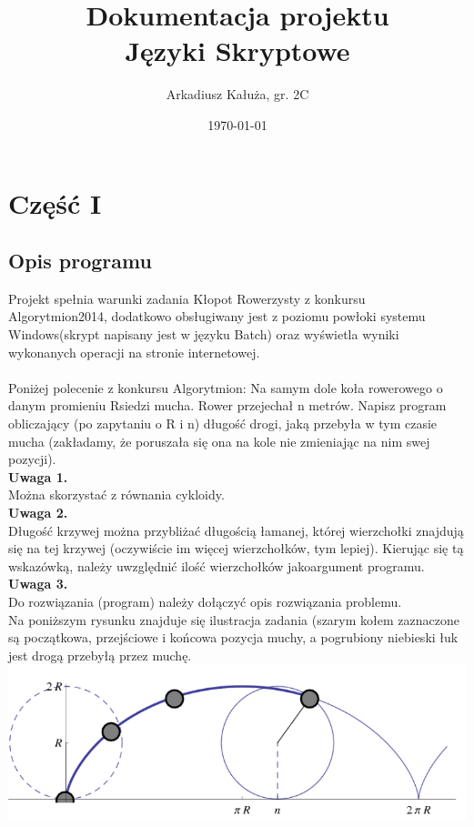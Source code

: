 \documentclass[12pt,a4paper]{article}
\begin{document}
	
	\title{Dokumentacja projektu\\ Języki Skryptowe}
	\author{Arkadiusz Kałuża, gr. 2C}
	\date{\today}
	
	\maketitle
	\newpage
	\section*{Część I}
	\subsection*{Opis programu}
	Projekt spełnia warunki zadania Kłopot Rowerzysty z konkursu Algorytmion2014, dodatkowo obsługiwany jest z poziomu powłoki systemu Windows(skrypt napisany jest w języku Batch) oraz wyświetla wyniki wykonanych operacji na stronie internetowej. 
	\\
	\\ \indent Poniżej polecenie z konkursu Algorytmion:
	Na  samym  dole  koła  rowerowego  o  danym  promieniu Rsiedzi  mucha.  Rower przejechał n metrów. Napisz program obliczający (po zapytaniu o R i n) długość drogi, jaką  przebyła  w  tym  czasie  mucha  (zakładamy,  że  poruszała  się  ona    na  kole  nie zmieniając na nim swej pozycji). \\
\textbf{Uwaga 1.}
	 \\Można skorzystać z równania cykloidy.\\ 
\textbf{Uwaga 2.}
	 \\Długość  krzywej  można  przybliżać  długością  łamanej,  której  				wierzchołki znajdują się na tej krzywej (oczywiście im więcej 					wierzchołków, tym lepiej). Kierując się tą wskazówką, należy 					uwzględnić ilość wierzchołków jakoargument programu.\\
\textbf{Uwaga 3.}
	 \\Do rozwiązania (program) należy dołączyć opis rozwiązania problemu.\\
	 
Na poniższym rysunku znajduje się ilustracja zadania (szarym kołem zaznaczone są początkowa,  przejściowe i końcowa pozycja muchy, a pogrubiony niebieski łuk jest drogą przebyłą przez muchę.\\
\includegraphics[scale=0.65]{picture1}
\end{document}
